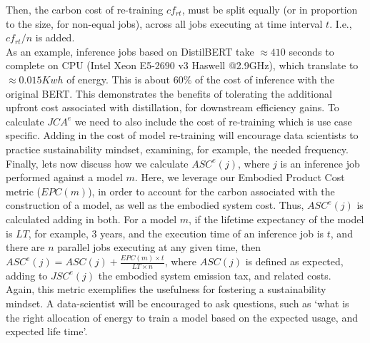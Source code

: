 Then, the carbon cost of re-training $cf_{rt}$, must be split equally (or in proportion to the size, for non-equal jobs), across all jobs executing at time interval $t$. I.e., $cf_{rt}/n$ is added.
\\
As an example, inference jobs based on DistilBERT take $\approx 410$ seconds to complete on CPU (Intel Xeon E5-2690 v3 Haswell @2.9GHz), which translate to $\approx 0.015Kwh$ of energy. This is about $60\%$ of the cost of inference with the original BERT. This demonstrates the benefits of tolerating the additional upfront cost associated with  distillation, for downstream efficiency gains. To
calculate $JCA^e$ we need to also include the cost of re-training which is use case specific. Adding in the cost of model re-training will encourage data scientists to practice sustainability mindset, examining, for example, the needed frequency. \\
Finally, lets now discuss how we calculate $ASC^e(j)$, where $j$ is an inference job performed against a model $m$. Here, we leverage our Embodied Product Cost metric ($EPC(m)$), in order 
to account for the carbon associated with  the construction of a model, as well as the embodied system cost. 
Thus, $ASC^e(j)$ is calculated adding in both. For a model $m$, if the lifetime expectancy of the 
model is $LT$, for example, $3$ years, and the execution time of an inference job is $t$, and there are $n$ parallel jobs executing at any given time, then $ASC^e(j) = ASC(j) + \frac{EPC(m) \times t}{LT \times n}$, where $ASC(j)$ is defined as expected, adding to $JSC^e(j)$ the 
embodied system emission tax, and related costs. 
\\
Again, this metric exemplifies the usefulness for fostering a sustainability mindset. A data-scientist will be encouraged to 
ask questions, such as `what is the right allocation of energy to train a model based on the expected usage, and expected life time'. 




